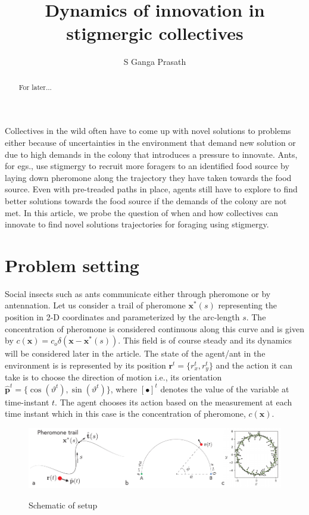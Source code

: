 \documentclass[%
reprint,
superscriptaddress,
floatfix,
amsmath,
amssymb,
aps,
notitlepage
]{revtex4-1}
\def\r{\mathbf{r}}
\def\x{\mathbf{x}}
\def\ph{\hat{\mathbf{p}}}
\def\theta{\vartheta}
\begin{document}
\title{Dynamics of innovation in stigmergic collectives}
\author{S Ganga Prasath}
\date{}

\begin{abstract}
For later...
\end{abstract}

\maketitle
Collectives in the wild often have to come up with novel solutions to problems either because
of uncertainties in the environment that demand new solution or due to high demands in the colony that
introduces a pressure to innovate. Ants, for egs., use stigmergy to recruit more
foragers to an identified food source by laying down pheromone along the trajectory they have taken towards the food source.
Even with pre-treaded paths in place, agents still have to explore to find
better solutions towards the food source if the demands of the colony are not met.
In this article, we probe the question of when and how collectives can innovate to find novel solutions
trajectories for foraging using stigmergy.

\section{Problem setting}
Social insects such as ants communicate either through pheromone or by antennation. Let us consider a trail of pheromone $\x^*(s)$ representing the position in 2-D coordinates and parameterized by the
arc-length $s$. The concentration of pheromone is considered continuous along this curve and is given by $c(\x) = c_o \delta(\x-\x^*(s))$.
This field is of course steady and its dynamics will be considered later in the article. The state of the agent/ant in
the environment is is represented by its position $\r^t=\{ r_x^t, r_y^t \}$ and the action it can take is to choose the
direction of motion i.e., its orientation $\ph^t = \{\cos(\theta^t), \sin(\theta^t)\}$, where $[\bullet]^t$ denotes the
value of the variable at time-instant $t$. The agent chooses its action based on the measurement at each time instant
which in this case is the concentration of pheromone, $c(\x)$.

\begin{figure}
    \centering
    \includegraphics[width=\textwidth]{./figs/schematic.pdf}\label{fig:schm1}
    \caption{Schematic of setup}
\end{figure}
\end{document}
